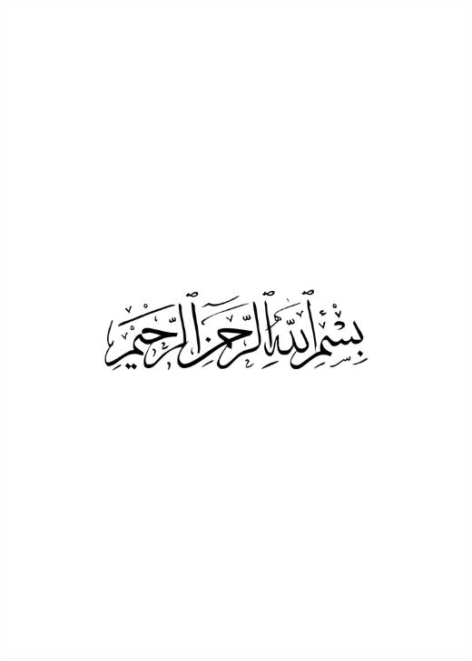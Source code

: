 \thispagestyle{empty}
\centerline{{\includegraphics[width=6in]{besmelah.pdf}}}
\newpage
\thispagestyle{empty}
\clearpage
~~~
\clearpage

